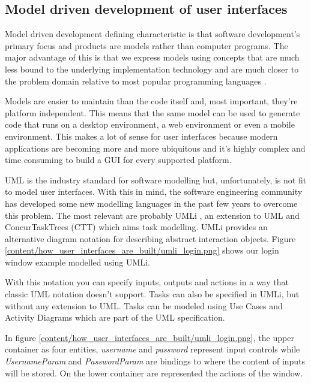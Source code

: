 \subsection{Model driven development of user interfaces}
Model driven development defining characteristic is that software development's primary focus and products are models rather than computer programs. The major advantage of this is that we express models using concepts that are much less bound to the underlying implementation technology and are much closer to the problem domain relative to most popular programming languages \cite{The_Pragmatics_of_Model-Driven_Development}.

Models are easier to maintain than the code itself and, most important, they're platform independent. This means that the same model can be used to generate code that runs on a desktop environment, a web environment or even a mobile environment. This makes a lot of sense for user interfaces because modern applications are becoming more and more ubiquitous and it's highly complex and time consuming to build a GUI for every supported platform.

UML \cite{The_Unified_Modeling_Language_Reference_Manual} is the industry standard for software modelling but, unfortunately, is not fit to model user interfaces. With this in mind, the software engineering community has developed some new modelling languages in the past few years to overcome this problem. The most relevant are probably UMLi \cite{User_Interface_Modeling_in_UMLi}, an extension to UML and ConcurTaskTrees (CTT) \cite{ConcurTaskTrees_A_Diagrammatic_Notation_for_Specifying_Task_Models} which aims task modelling. UMLi provides an alternative diagram notation for describing abstract interaction objects. Figure \ref{content/how_user_interfaces_are_built/umli_login.png} shows our login window example modelled using UMLi.

With this notation you can specify inputs, outputs and actions in a way that classic UML notation doesn’t support. Tasks can also be specified in UMLi, but without any extension to UML. Tasks can be modeled using Use Cases and Activity Diagrams which are part of the UML specification.

In figure \ref{content/how_user_interfaces_are_built/umli_login.png}, the upper container as four entities, \textit{username} and \textit{password} represent input controls while \textit{UsernameParam} and \textit{PasswordParam} are bindings to where the content of inputs will be stored. On the lower container are represented the actions of the window.

